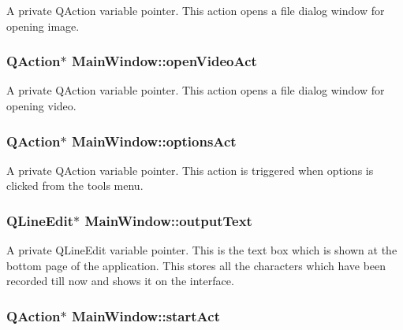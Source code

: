 \label{classMainWindow_af702728ef74d0f2d63d0149f9a92a576}
A private QAction variable pointer. This action opens a file dialog window for opening image. \hypertarget{classMainWindow_ad11682f531780b5ee71109c3f45fa822}{
\subsubsection[{openVideoAct}]{\setlength{\rightskip}{0pt plus 5cm}QAction$\ast$ {\bf MainWindow::openVideoAct}}}
\label{classMainWindow_ad11682f531780b5ee71109c3f45fa822}
A private QAction variable pointer. This action opens a file dialog window for opening video. \hypertarget{classMainWindow_a6a4dce5f772be8e78902061458d7e556}{
\subsubsection[{optionsAct}]{\setlength{\rightskip}{0pt plus 5cm}QAction$\ast$ {\bf MainWindow::optionsAct}}}
\label{classMainWindow_a6a4dce5f772be8e78902061458d7e556}
A private QAction variable pointer. This action is triggered when options is clicked from the tools menu. \hypertarget{classMainWindow_a504da7e825659f9a9b5db33c0be362d5}{
\subsubsection[{outputText}]{\setlength{\rightskip}{0pt plus 5cm}QLineEdit$\ast$ {\bf MainWindow::outputText}}}
\label{classMainWindow_a504da7e825659f9a9b5db33c0be362d5}
A private QLineEdit variable pointer. This is the text box which is shown at the bottom page of the application. This stores all the characters which have been recorded till now and shows it on the interface. \hypertarget{classMainWindow_a88a89355c71689ae45113472ffe084ee}{
\subsubsection[{startAct}]{\setlength{\rightskip}{0pt plus 5cm}QAction$\ast$ {\bf MainWindow::startAct}}}
